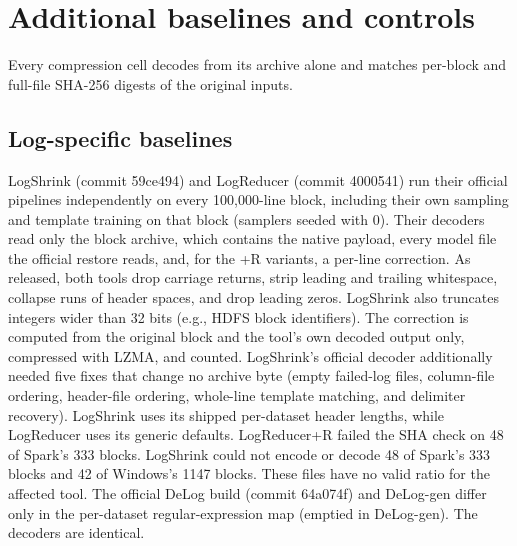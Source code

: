 \section{Additional baselines and controls}\label{sec:r76}\sloppy

Every compression cell decodes from its archive alone and matches per-block and full-file SHA-256 digests of the original inputs.

\subsection{Log-specific baselines}

LogShrink (commit 59ce494) and LogReducer (commit 4000541) run their official pipelines independently on every 100,000-line block, including their own sampling and template training on that block (samplers seeded with 0). Their decoders read only the block archive, which contains the native payload, every model file the official restore reads, and, for the +R variants, a per-line correction. As released, both tools drop carriage returns, strip leading and trailing whitespace, collapse runs of header spaces, and drop leading zeros. LogShrink also truncates integers wider than 32 bits (e.g., HDFS block identifiers). The correction is computed from the original block and the tool\textquoteright s own decoded output only, compressed with LZMA, and counted. LogShrink\textquoteright s official decoder additionally needed five fixes that change no archive byte (empty failed-log files, column-file ordering, header-file ordering, whole-line template matching, and delimiter recovery). LogShrink uses its shipped per-dataset header lengths, while LogReducer uses its generic defaults. LogReducer+R failed the SHA check on 48 of Spark\textquoteright s 333 blocks. LogShrink could not encode or decode 48 of Spark\textquoteright s 333 blocks and 42 of Windows\textquoteright s 1147 blocks. These files have no valid ratio for the affected tool. The official DeLog build (commit 64a074f) and DeLog-gen differ only in the per-dataset regular-expression map (emptied in DeLog-gen). The decoders are identical.



